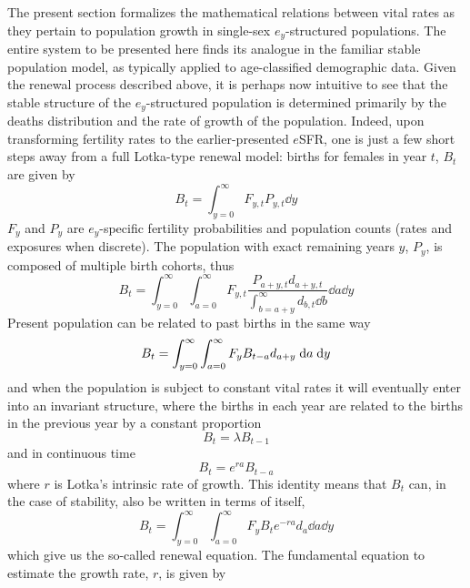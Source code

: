  \FloatBarrier
 \label{sec:ex2sexequation}
The present section formalizes the mathematical relations between vital
rates as they pertain to population growth in single-sex $e_y$-structured
populations. The entire system to be presented here finds its analogue in the
familiar stable population model, as typically applied to age-classified
demographic data. Given the renewal process described above, it is perhaps now
intuitive to see that the stable structure of the $e_y$-structured population is determined
primarily by the deaths distribution and the rate of growth of the
population. Indeed, upon transforming fertility rates to the earlier-presented
$e$SFR, one is just a few short steps away from a full Lotka-type renewal
model: births for females in year $t$, $B_{t}$ are given by
\begin{equation}
B_t = \int_{y=0}^\infty F_{y,t} P_{y,t} \dd y
\end{equation}
$F_y$ and $P_y$ are $e_y$-specific fertility probabilities and population
counts (rates and exposures when discrete). The population with
exact remaining years $y$, $P_y$, is composed of multiple birth cohorts, thus
\begin{equation}
B_t = \int_{y=0}^\infty \int_{a=0}^\infty F_{y,t}
\frac{P_{a+y,t}d_{a+y,t}}{\int_{b=a+y}^\infty d_{b,t} \dd b} \dd a \dd y
\end{equation}
Present population can be related to past
births in the same way
\begin{equation}
B_t = \int_{y=0}^\infty \int_{a=0}^\infty F_y B_{t-a}d_{a+y} \; \mathrm{d} a \; \mathrm{d} y \notag
\end{equation}
and when the population is subject to constant vital rates it will eventually
enter into an invariant structure, where the births in each year are related to
the births in the previous year by a constant proportion
\begin{equation}
B_t = \lambda B_{t-1}
\end{equation}
and in continuous time
\begin{equation}
B_t = e^{ra}B_{t-a}
\end{equation}
where $r$ is Lotka's intrinsic rate of growth. This identity means that $B_t$
can, in the case of stability, also be written in terms of itself,
\begin{equation}
\label{eq:exrenewal1sex}
B_t = \int_{y=0}^\infty \int_{a=0}^\infty F_y B_{t}e^{-ra}d_{a}\dd a \dd y
\end{equation}
which give us the so-called renewal equation. The fundamental equation to
estimate the growth rate, $r$, is given by
